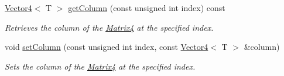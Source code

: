\begin{DoxyCompactItemize}
\hyperlink{classsparky_1_1_vector4}{Vector4}$<$ T $>$ \hyperlink{classsparky_1_1_matrix4_a67852f022dc0622ab75f29ef6f6a7467}{get\+Column} (const unsigned int index) const 
\begin{DoxyCompactList}\small\item\em Retrieves the column of the \hyperlink{classsparky_1_1_matrix4}{Matrix4} at the specified index. \end{DoxyCompactList}\item 
void \hyperlink{classsparky_1_1_matrix4_af540af1c696c1fdad99249c6a607ea61}{set\+Column} (const unsigned int index, const \hyperlink{classsparky_1_1_vector4}{Vector4}$<$ T $>$ \&column)
\begin{DoxyCompactList}\small\item\em Sets the column of the \hyperlink{classsparky_1_1_matrix4}{Matrix4} at the specified index. \end{DoxyCompactList}\end{DoxyCompactItemize}
